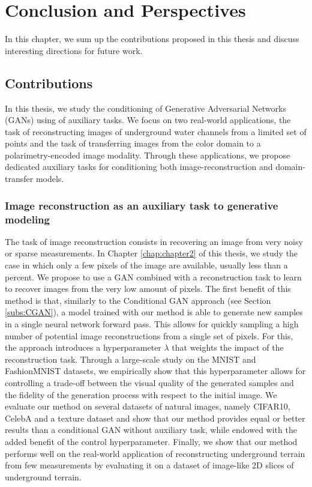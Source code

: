 \chapter{Conclusion and Perspectives}
\label{chap:conclusion}

In this chapter, we sum up the contributions proposed in this thesis and discuss interesting directions for future work.

\section*{Contributions}

In this thesis, we study the conditioning of Generative Adversarial Networks (\ac{GANs}) using of auxiliary tasks. We focus on two real-world applications, the task of reconstructing images of underground water channels from a limited set of points and the task of transferring images from the color domain to a polarimetry-encoded image modality.  Through these applications, we propose dedicated auxiliary tasks for conditioning both image-reconstruction and domain-transfer models.

\subsection*{Image reconstruction as an auxiliary task to generative modeling}

The task of image reconstruction consists in recovering an image from very noisy or sparse measurements. In Chapter \ref{chap:chapter2} of this thesis, we study the case in which only a few pixels of the image are available, usually less than a percent. We propose to use a \ac{GAN} combined with a reconstruction task to learn to recover images from the very low amount of pixels. The first benefit of this method is that, similarly to the Conditional GAN approach (see Section \ref{subs:CGAN}), a model trained with our method is able to generate new samples in a single neural network forward pass. This allows for quickly sampling a high number of potential image reconstructions from a single set of pixels. For this, the approach introduces a hyperparameter $\lambda$ that weights the impact of the reconstruction task. Through a large-scale study on the MNIST and FashionMNIST datasets, we empirically show that this hyperparameter allows for controlling a trade-off between the visual quality of the generated samples and the fidelity of the generation process with respect to the initial image. We evaluate our method on several datasets of natural images, namely CIFAR10, CelebA and a texture dataset and show that our method provides equal or better results than a conditional GAN without auxiliary task, while endowed with the added benefit of the control hyperparameter. Finally, we show that our method performs well on the real-world application of reconstructing underground terrain from few measurements by evaluating it on a dataset of image-like 2D slices of underground terrain.

